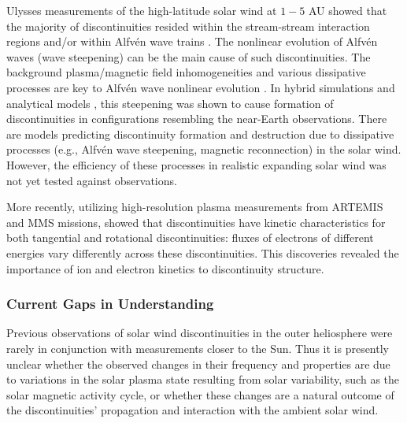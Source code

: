 \documentclass[
  letterpaper,
  DIV=11,
  numbers=noendperiod]{scrartcl}
\begin{document}
Ulysses measurements of the high-latitude solar wind at \(1-5\) AU showed that the majority of discontinuities resided within the stream-stream interaction regions and/or within Alfvén wave trains \citep{tsurutaniInterplanetaryDiscontinuitiesAlfven1995, tsurutaniReviewDiscontinuitiesAlfven1999}. The nonlinear evolution of Alfvén waves (wave steepening) can be the main cause of such discontinuities. The background plasma/magnetic field inhomogeneities and various dissipative processes are key to Alfvén wave nonlinear evolution \citep{Lerche75, Prakash&Diamond99, Medvedev97:prl, Nariyuki14, Yang15}. In hybrid simulations \citep[see][]{Vasquez&Hollweg98, Vasquez&Hollweg01, TenBarge&Howes13} and analytical models \citep[e.g.,][]{Kennel88:jetp, Hada89, Malkov91, Wu&Kennel92, Medvedev97:pop}, this steepening was shown to cause formation of discontinuities in configurations resembling the near-Earth observations. There are models predicting discontinuity formation \citep{Servidio15, Podesta&Roytershteyn17} and destruction \citep{Servidio11,Matthaeus15} due to dissipative processes (e.g., Alfvén wave steepening, magnetic reconnection) in the solar wind. However, the efficiency of these processes in realistic expanding solar wind was not yet tested against observations.

More recently, utilizing high-resolution plasma measurements from ARTEMIS and MMS missions, \citet{artemyevKineticNatureSolar2019} showed that discontinuities have kinetic characteristics for both tangential and rotational discontinuities: fluxes of electrons of different energies vary differently across these discontinuities. This discoveries revealed the importance of ion and electron kinetics to discontinuity structure.

\subsubsection{Current Gaps in Understanding}\label{current-gaps-in-understanding}

Previous observations of solar wind discontinuities in the outer heliosphere were rarely in conjunction with measurements closer to the Sun. Thus it is presently unclear whether the observed changes in their frequency and properties are due to variations in the solar plasma state resulting from solar variability, such as the solar magnetic activity cycle, or whether these changes are a natural outcome of the discontinuities' propagation and interaction with the ambient solar wind.
\end{document}
